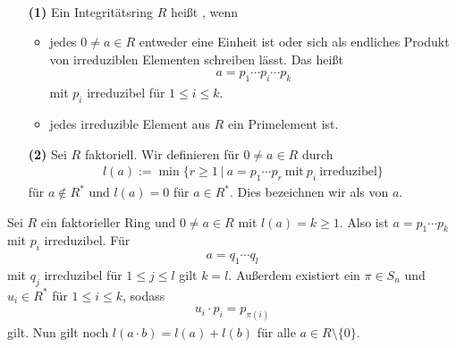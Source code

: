 \begin{df}\label{skript:9.4} \
	\begin{enumerate}
		\item[\textbf{(1)}]
		Ein Integritätsring $ R $ heißt , wenn 
		\begin{itemize}
			\item
			jedes $ 0 \neq a \in R $ entweder eine Einheit ist
			oder sich als endliches Produkt von irreduziblen Elementen schreiben lässt.
			Das heißt
			\begin{align*}
			a = p_1\cdots p_i \cdots p_k
			\end{align*}
			mit $ p_i $ irreduzibel für $ 1 \leq i \leq k $.
			
			\item
			jedes irreduzible Element aus $ R $ ein Primelement ist.	
		\end{itemize}
		
		\item[\textbf{(2)}]
		Sei $ R $ faktoriell.
		Wir definieren für $ 0 \neq a \in R $ durch
		 \begin{align*}
		 l(a) := \min \lbrace r \geq 1 \ | \ a= p_1 \cdots p_r 
		 \ \text{mit} \ p_i \ \text{irreduzibel} \rbrace
		 \end{align*}
		 für $ a \notin R^\ast $ und $ l(a) = 0 $ für $ a \in R^\ast $.
		 Dies bezeichnen wir als  von $ a $.
	\end{enumerate}
\end{df}

\begin{sz}\label{skript:9.5}
	Sei $ R $ ein faktorieller Ring und 
	$ 0 \neq a \in R $ mit $ l(a) = k \geq 1 $.
	Also ist $ a = p_1 \cdots p_k $ mit $ p_i $ irreduzibel.
	Für
	\begin{align*}
	a = q_1 \cdots q_l
	\end{align*}
	mit $ q_j $ irreduzibel für $ 1 \leq j \leq l $ gilt $ k = l $.
	Außerdem existiert ein $ \pi \in S_n $ und $ u_i \in R^\ast$
	für $ 1 \leq i \leq k$, sodass 
	\begin{align*}
	u_i \cdot p_i = p_{\pi(i)}
	\end{align*}
	gilt.
	Nun gilt noch $ l(a \cdot b) = l(a) + l(b) $ für alle
	$ a \in R \setminus \lbrace 0 \rbrace $.
\end{sz}

